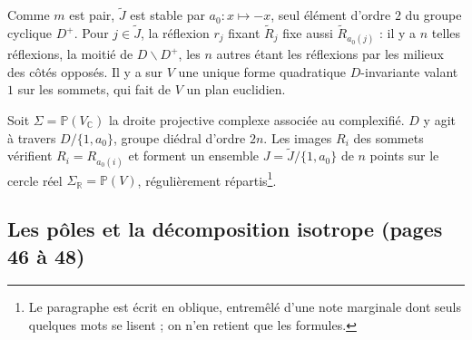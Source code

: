 \documentclass[11pt,a4paper]{article}
\begin{document}
Comme $m$ est pair, $\tilde J$ est stable par $a_0 : x \mapsto -x$, seul
élément d'ordre $2$ du groupe cyclique $D^{+}$. Pour $j \in \tilde J$, la
réflexion $r_j$ fixant $\widetilde{R}_j$ fixe aussi $\widetilde{R}_{a_0(j)}$ :
il y a $n$ telles réflexions, la moitié de $D \smallsetminus D^{+}$, les $n$
autres étant les réflexions par les milieux des côtés opposés. Il y a sur $V$
une unique forme quadratique $D$-invariante valant $1$ sur les sommets, qui
fait de $V$ un plan euclidien.

Soit $\Sigma = \mathbb{P}(V_{\mathbb{C}})$ la droite projective complexe
associée au complexifié. $D$ y agit à travers $D/\{1, a_0\}$, groupe diédral
d'ordre $2n$. Les images $R_i$ des sommets vérifient $R_i = R_{a_0(i)}$ et
forment un ensemble $J = \tilde J/\{1, a_0\}$ de $n$ points sur le cercle réel
$\Sigma_{\mathbb{R}} = \mathbb{P}(V)$, régulièrement répartis\footnote{Le
paragraphe est écrit en oblique, entremêlé d'une note marginale dont seuls
quelques mots se lisent ; on n'en retient que les formules.}.

\subsection*{Les pôles et la décomposition isotrope (pages 46 à 48)}
\end{document}
